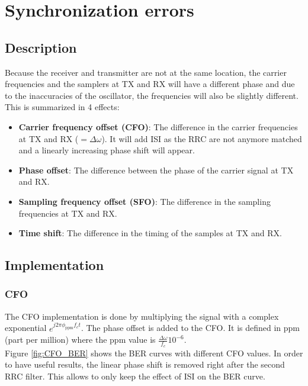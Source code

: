 \setcounter{secnumdepth}{-1}

\chapter{Synchronization errors}

\section{Description}

Because the receiver and transmitter are not at the same location, the carrier frequencies and the samplers at TX and RX will have a different phase and due to the inaccuracies of the oscillator, the frequencies will also be slightly different. \\
This is summarized in 4 effects:
\begin{itemize}
    \item \textbf{Carrier frequency offset (CFO)}: The difference in the carrier frequencies at TX and RX ($=\Delta \omega$). It will add ISI as the RRC are not anymore matched and a linearly increasing phase shift will appear.
    \item \textbf{Phase offset}: The difference between the phase of the carrier signal at TX and RX.
    \item \textbf{Sampling frequency offset (SFO)}: The difference in the sampling frequencies at TX and RX.
    \item \textbf{Time shift}: The difference in the timing of the samples at TX and RX.
\end{itemize}

\section{Implementation}

\subsection{CFO}
The CFO implementation is done by multiplying the signal with a complex exponential $e^{j2\pi \phi_{\text{ppm}}f_c t}$. The phase offset is added to the CFO. It is defined in ppm (part per million) where the ppm value is $\frac{\Delta\omega}{f_c} 10^{-6}$. \\
Figure \ref{fig:CFO_BER} shows the BER curves with different CFO values. In order to have useful results, the linear phase shift is removed right after the second RRC filter. This allows to only keep the effect of ISI on the BER curve.

